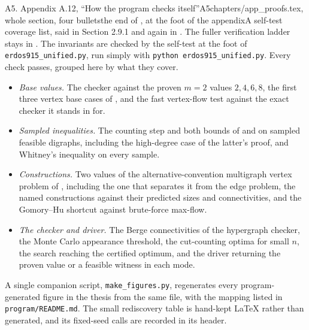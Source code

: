 \begin{offcut}{A5. Appendix A.12, ``How the program checks itself''}{A5}{chapters/app\_proofs.tex, whole section, four bullets}{the end of , at the foot of the appendix}{A self-test coverage list, said in Section 2.9.1 and again in . The fuller verification ladder stays in .}
The invariants are checked by the self-test at the foot of \texttt{erdos915\_unified.py}, run simply with \texttt{python erdos915\_unified.py}. Every check passes, grouped here by what they cover.
\begin{itemize}
    \item \emph{Base values.} The checker against the proven $m = 2$ values $2, 4, 6, 8$, the first three vertex base cases of , and the fast vertex-flow test against the exact checker it stands in for.
    \item \emph{Sampled inequalities.} The counting step and both bounds of  and  on sampled feasible digraphs, including the high-degree case of the latter's proof, and Whitney's inequality on every sample.
    \item \emph{Constructions.} Two values of the alternative-convention multigraph vertex problem of , including the one that separates it from the edge problem, the named constructions against their predicted sizes and connectivities, and the Gomory--Hu shortcut against brute-force max-flow.
    \item \emph{The checker and driver.} The Berge connectivities of the hypergraph checker, the Monte Carlo appearance threshold, the cut-counting optima for small $n$, the search reaching the certified optimum, and the driver returning the proven value or a feasible witness in each mode.
\end{itemize}
A single companion script, \texttt{make\_figures.py}, regenerates every
program-generated figure in the thesis from the same file, with the mapping
listed in \texttt{program/README.md}.  The small rediscovery table is hand-kept
LaTeX rather than generated, and its fixed-seed calls are recorded in its header.
\end{offcut}

